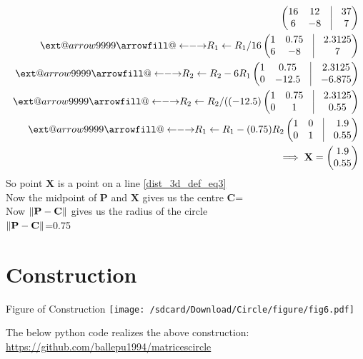 \documentclass[journal,12pt,twocolumn]{IEEEtran}
\makeatletter
\newcommand\xleftrightarrow[2][]{%
  \ext@arrow 9999{\longleftrightarrowfill@}{#1}{#2}}
\newcommand\longleftrightarrowfill@{%
  \arrowfill@\leftarrow\relbar\rightarrow}
\let\vec\mathbf
\makeatother
\begin{document}
\begin{tableofcontents}
     \begin{align}
       \myvec{
        16 & 12 & \vrule & 37
       \\
       6 & -8  &\vrule & 7
      }
      \\
      \xleftrightarrow[]{R_1 \leftarrow R_1/16 }
       \myvec{
        1 & 0.75 & \vrule & 2.3125
       \\
       6 & -8  &\vrule & 7
      }
      \\
      \xleftrightarrow[]{R_2 \leftarrow R_2 -6 R_1 }
       \myvec{
        1 & 0.75 & \vrule & 2.3125
       \\
       0 & -12.5  &\vrule & -6.875
      }
        \\
	     \xleftrightarrow[]{R_2 \leftarrow R_2/((-12.5) }
       \myvec{
        1 & 0.75 & \vrule & 2.3125
       \\
       0 & 1  &\vrule & 0.55
      }
        \\
	     \xleftrightarrow[]{R_1 \leftarrow R_1-(0.75)R_2 }   
	     \myvec{                   
	     1 & 0 & \vrule & 1.9  \\                         
	     0 & 1  &\vrule & 0.55
	     }
	     \\    
       \implies \vec{X} = \myvec{1.9 \\ 0.55}    
     \end{align}
So point $\vec{X}$ is a point on a line \eqref{dist_3d_def_eq3}\\
Now the midpoint of $\vec P$ and $\vec X$ gives us the centre $\vec C$= \\
Now $\vec{\norm{P-C}}$ gives us the radius of the circle \\
$\vec{\norm{P-C}}$=0.75
\section{Construction}
 	\begin{center}
		Figure of Construction
\texttt{[image: /sdcard/Download/Circle/figure/fig6.pdf]}
	\end{center}
  	\vspace{1mm}
The below python code realizes the above construction:	\\
\url{https://github.com/ballepu1994/matricescircle}

\end{tableofcontents}
\end{document}

